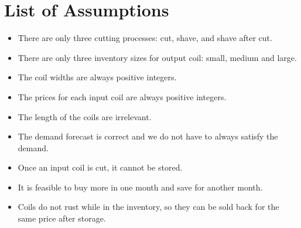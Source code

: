 \documentclass{article}[12pt]
\begin{document}
\section{List of Assumptions}
\begin{itemize}
	\item There are only three cutting processes: cut, shave, and shave after cut.
	
	\item There are only three inventory sizes for output coil: small, medium and large.
	
	\item The coil widths are always positive integers.
	
	\item The prices for each input coil are always positive integers.
	
	\item The length of the coils are irrelevant.
	
	\item The demand forecast is correct and we do not have to always satisfy the demand.
	
	\item Once an input coil is cut, it cannot be stored.
	
	\item It is feasible to buy more in one month and save for another month.
	\item Coils do not rust while in the inventory, so they can be sold back for the same price after storage.
\end{itemize}
\end{document}
